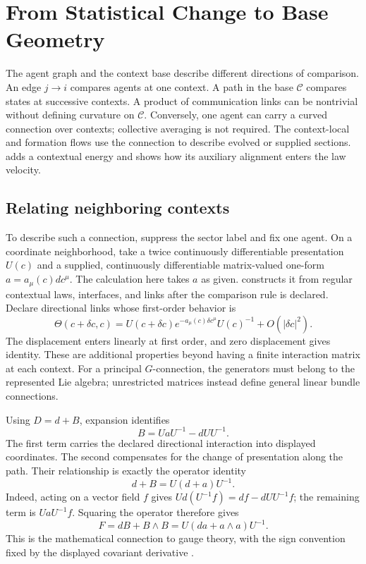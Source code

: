 \chapter{From Statistical Change to Base Geometry}
\label{comp:geometry}

The agent graph and the context base describe different directions of comparison. An edge $j\to i$ compares agents at one context. A path in the base $\mathcal C$ compares states at successive contexts. A product of communication links can be nontrivial without defining curvature on $\mathcal C$. Conversely, one agent can carry a curved connection over contexts; collective averaging is not required. The context-local and formation flows use the connection to describe evolved or supplied sections.  adds a contextual energy and shows how its auxiliary alignment enters the law velocity.

\section{Relating neighboring contexts}

To describe such a connection, suppress the sector label and fix one agent. On a coordinate neighborhood, take a twice continuously differentiable presentation $U(c)$ and a supplied, continuously differentiable matrix-valued one-form $a=a_\mu(c)dc^\mu$. The calculation here takes $a$ as given.  constructs it from regular contextual laws, interfaces, and links after the comparison rule is declared. Declare directional links whose first-order behavior is
\begin{equation}
\Theta(c+\delta c,c)
=U(c+\delta c)e^{-a_\mu(c)\delta c^\mu}U(c)^{-1}
+O(|\delta c|^2).
\end{equation}
The displacement enters linearly at first order, and zero displacement gives identity. These are additional properties beyond having a finite interaction matrix at each context. For a principal $G$-connection, the generators must belong to the represented Lie algebra; unrestricted matrices instead define general linear bundle connections.

Using $D=d+B$, expansion identifies
\begin{equation}
B=UaU^{-1}-dUU^{-1}.
\end{equation}
The first term carries the declared directional interaction into displayed coordinates. The second compensates for the change of presentation along the path. Their relationship is exactly the operator identity
\begin{equation}
d+B=U(d+a)U^{-1}.
\end{equation}
Indeed, acting on a vector field $f$ gives $U d(U^{-1}f)=df-dUU^{-1}f$; the remaining term is $UaU^{-1}f$. Squaring the operator therefore gives
\begin{equation}
F=dB+B\wedge B=U(da+a\wedge a)U^{-1}.
\end{equation}
This is the mathematical connection to gauge theory, with the sign convention fixed by the displayed covariant derivative \citep{Tong2018}.

